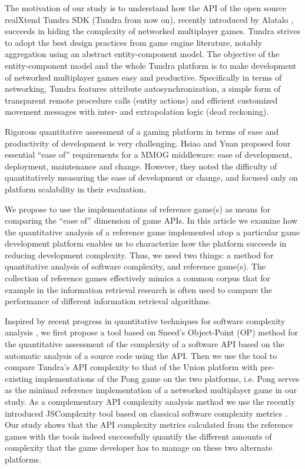 \documentclass[conference]{IEEEtran}
\begin{document}
The motivation of our study is to understand how the API of the open
source realXtend Tundra SDK (Tundra from now on), recently introduced
by Alatalo \cite{Alatalo2011}, succeeds in hiding the complexity of
networked multiplayer games. Tundra strives to adopt the best design
practices from game engine literature, notably aggregation using an
abstract entity-component model. The objective of the entity-component
model and the whole Tundra platform is to make development of
networked multiplayer games easy and productive. Specifically in terms
of networking, Tundra features attribute autosynchronization, a simple
form of transparent remote procedure calls (entity actions) and
efficient customized movement messages with inter- and extrapolation
logic (dead reckoning).

Rigorous quantitative assessment of a gaming platform in terms of ease
and productivity of development is very challenging. Hsiao and Yuan
\cite{middleware} proposed four essential ``ease of'' requirements for
a MMOG middleware: ease of development, deployment, maintenance and
change. However, they noted the difficulty of quantitatively measuring
the ease of development or change, and focused only on platform
scalability in their evaluation.

We propose to use the implementations of reference game(s) as means
for comparing the “ease of” dimension of game APIs. In this article we
examine how the quantitative analysis of a reference game implemented
atop a particular game development platform enables us to characterize
how the platform succeeds in reducing development complexity. Thus, we
need two things: a method for quantitative analysis of software
complexity, and reference game(s). The collection of reference games
effectively mimics a common corpus that for example in the information
retrieval research is often used to compare the performance of
different information retrieval algorithms.

Inspired by recent progress in quantitative techniques for software
complexity analysis \cite{cmu-api_failures,api-complexity-analysis},
we first propose a tool based on Sneed’s Object-Point (OP) method for
the quantitative assessment of the complexity of a software API based
on the automatic analysis of a source code using the API. Then we use
the tool to compare Tundra’s API complexity to that of the Union
platform with pre-existing implementations of the Pong game on the two
platforms, i.e. Pong serves as the minimal reference implementation of
a networked multiplayer game in our study. As a complementary API
complexity analysis method we use the recently introduced JSComplexity
tool based on classical software complexity metrics
\cite{jscomplexity}. Our study shows that the API complexity metrics
calculated from the reference games with the tools indeed successfully
quantify the different amounts of complexity that the game developer
has to manage on these two alternate platforms.
\end{document}
